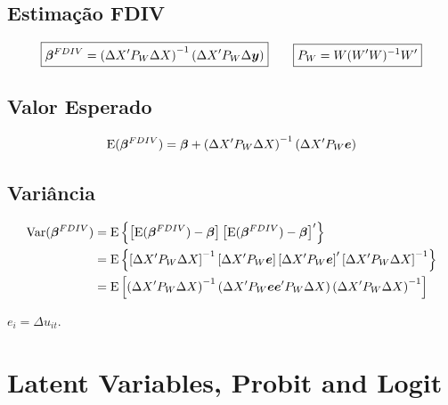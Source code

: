 \documentclass[11pt, oneside, a4paper, article]{article}
\numberwithin{equation}{section}
\begin{document}
\begin{description}
	\subsection{Estimação FDIV}

	\vspace{-1 em}
	\begin{align*}
		\boxed{
			\boldsymbol{\beta}^{FDIV} =  
			\left(
				\Delta X' P_{W} \Delta X 
			\right)^{-1}
			\left(
				\Delta X' P_{W} \Delta \boldsymbol{y}
			\right)
		}
		\qquad
		\boxed{
		P_{W} = W(W'W)^{-1}W'}
	\end{align*}

	\subsection{Valor Esperado}

	\vspace{-1 em}
	\begin{align*}
		\text{E}( \boldsymbol{\beta}^{FDIV} ) =  
		\boldsymbol{\beta} + 
		\left( \Delta X' P_{W} \Delta X \right)^{-1}
		\left( \Delta X' P_{W} \boldsymbol{e} \right)
	\end{align*}

	\subsection{Variância}

	\vspace{-1 em}
	\begin{align*}
		\text{Var}( \boldsymbol{\beta}^{FDIV} ) &=
		\text{E}\left\{  
			\left[ \text{E}( \boldsymbol{\beta}^{FDIV} ) - \boldsymbol{\beta} \right] 
			\left[ \text{E}( \boldsymbol{\beta}^{FDIV} ) - \boldsymbol{\beta} \right]'
		\right\}
		\\
		&=
		\text{E}\left\{  
			\left[ \Delta X' P_{W} \Delta X \right]^{-1}
			\left[ \Delta X' P_{W} \boldsymbol{e} \right]
			\left[ \Delta X' P_{W} \boldsymbol{e} \right]'
			\left[ \Delta X' P_{W} \Delta X \right]^{-1}
		\right\}
		\\
		&=
		\text{E}\left[
			\left( \Delta X' P_{W} \Delta X \right)^{-1}
			\left( \Delta X' P_{W} \boldsymbol{e} \boldsymbol{e}' P_{W} \Delta X \right)
			\left( \Delta X' P_{W} \Delta X \right)^{-1}
		\right]
	\end{align*}

	\noindent
	$e_{i} = \Delta u_{it}$.

	\clearpage
	\section{Latent Variables, Probit and Logit}


\end{description}
\end{document}
